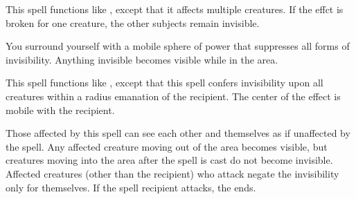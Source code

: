 \spellrng{\rngmed}
\begin{spelleffect}
  This spell functions like , except that it affects multiple creatures. If the effct is broken for one creature, the other subjects remain invisible.
\end{spelleffect}

\begin{spelleffect}
  You surround yourself with a mobile sphere of power that suppresses all forms of invisibility. Anything invisible becomes visible while in the area.
\end{spelleffect}

\begin{spelleffect}
  This spell functions like , except that this spell confers invisibility upon all creatures within a \areasmall radius emanation of the recipient. The center of the effect is mobile with the recipient.
  \par Those affected by this spell can see each other and themselves as if unaffected by the spell. Any affected creature moving out of the area becomes visible, but creatures moving into the area after the spell is cast do not become invisible. Affected creatures (other than the recipient) who attack negate the invisibility only for themselves. If the spell recipient attacks, the  ends.
\end{spelleffect}

